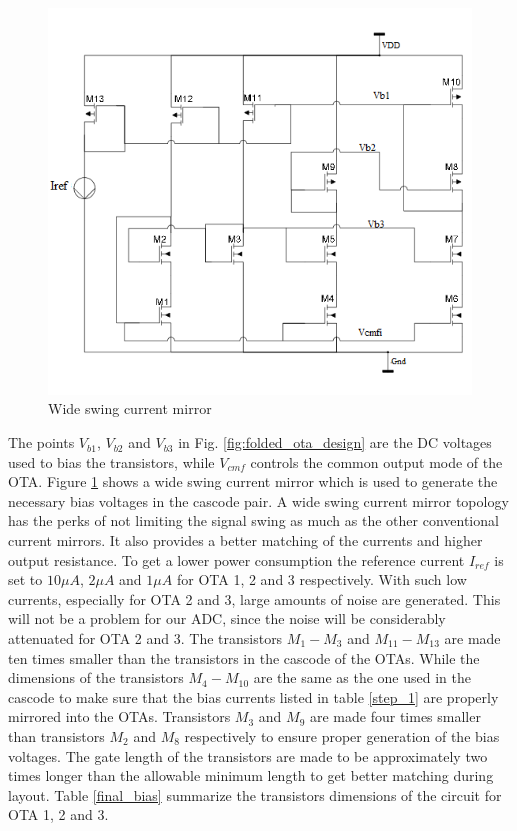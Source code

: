 \begin{figure}[h!]
\centering
\includegraphics[scale = 0.7]{images/bias_circuit.png}
\caption{Wide swing current mirror}
\label{bias circuit}
\end{figure}

The points $V_{b1}$, $V_{b2}$ and $V_{b3}$ in Fig. \ref{fig:folded_ota_design} are the DC voltages used to bias the transistors, while $V_{cmf}$ controls the common output mode of the OTA. Figure \ref{bias circuit} shows a wide swing current mirror \cite{Allen} which is used to generate the necessary bias voltages in the cascode pair. A wide swing current mirror topology has the perks of not limiting the signal swing as much as the other conventional current mirrors. It also provides a better matching of the currents and higher output resistance. To get a lower power consumption the reference current $I_{ref}$ is set to $10\mu A$, $2\mu A$ and $1\mu A$ for OTA 1, 2 and 3 respectively. With such low currents, especially for OTA 2 and 3, large amounts of noise are generated. This will not be a problem for our ADC, since the noise will be considerably attenuated for OTA 2 and 3. The transistors $M_1-M_3$ and $M_{11}-M_{13}$ are made ten times smaller than the transistors in the cascode of the OTAs. While the dimensions of the transistors $M_{4} - M_{10}$ are the same as the one used in the cascode to make sure that the bias currents listed in table \ref{step_1} are properly mirrored into the OTAs. Transistors $M_3$ and $M_9$ are made four times smaller than transistors $M_2$ and $M_8$ respectively to ensure proper generation of the bias voltages\cite{Johns}. The gate length of the transistors are made to be approximately two times longer than the allowable minimum length to get better matching during layout. Table \ref{final_bias} summarize the transistors dimensions of the circuit for OTA 1, 2 and 3.    

